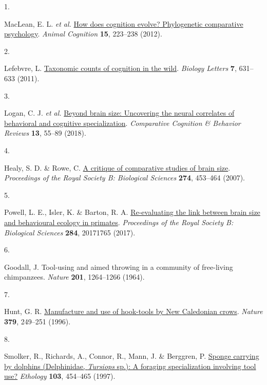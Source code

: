 \documentclass[
  man,floatsintext]{apa6}
\newlength{\cslhangindent}
\newlength{\csllabelwidth}
\newlength{\cslentryspacingunit} %
\newenvironment{CSLReferences}[2] %
 {%
  \setlength{\parindent}{0pt}
  \ifodd #1
  \let\oldpar\par
  \def\par{\hangindent=\cslhangindent\oldpar}
  \fi
  \setlength{\parskip}{#2\cslentryspacingunit}
 }%
 {}
\newcommand{\CSLLeftMargin}[1]{\parbox[t]{\csllabelwidth}{#1}}
\newcommand{\CSLRightInline}[1]{\parbox[t]{\linewidth - \csllabelwidth}{#1}\break}
\begin{document}
\hypertarget{refs}{}
\begin{CSLReferences}{0}{0}
\leavevmode{}%
\CSLLeftMargin{1. }%
\CSLRightInline{MacLean, E. L. \emph{et al.} \href{https://doi.org/10.1007/s10071-011-0448-8}{How does cognition evolve? Phylogenetic comparative psychology}. \emph{Animal Cognition} \textbf{15}, 223--238 (2012).}

\leavevmode{}%
\CSLLeftMargin{2. }%
\CSLRightInline{Lefebvre, L. \href{https://doi.org/10.1098/rsbl.2010.0556}{Taxonomic counts of cognition in the wild}. \emph{Biology Letters} \textbf{7}, 631--633 (2011).}

\leavevmode{}%
\CSLLeftMargin{3. }%
\CSLRightInline{Logan, C. J. \emph{et al.} \href{https://doi.org/10.3819/CCBR.2018.130008}{Beyond brain size: Uncovering the neural correlates of behavioral and cognitive specialization}. \emph{Comparative Cognition \& Behavior Reviews} \textbf{13}, 55--89 (2018).}

\leavevmode{}%
\CSLLeftMargin{4. }%
\CSLRightInline{Healy, S. D. \& Rowe, C. \href{https://doi.org/10.1098/rspb.2006.3748}{A critique of comparative studies of brain size}. \emph{Proceedings of the Royal Society B: Biological Sciences} \textbf{274}, 453--464 (2007).}

\leavevmode{}%
\CSLLeftMargin{5. }%
\CSLRightInline{Powell, L. E., Isler, K. \& Barton, R. A. \href{https://doi.org/10.1098/rspb.2017.1765}{Re-evaluating the link between brain size and behavioural ecology in primates}. \emph{Proceedings of the Royal Society B: Biological Sciences} \textbf{284}, 20171765 (2017).}

\leavevmode{}%
\CSLLeftMargin{6. }%
\CSLRightInline{Goodall, J. Tool-using and aimed throwing in a community of free-living chimpanzees. \emph{Nature} \textbf{201}, 1264--1266 (1964).}

\leavevmode{}%
\CSLLeftMargin{7. }%
\CSLRightInline{Hunt, G. R. \href{https://doi.org/10.1038/379249a0}{Manufacture and use of hook-tools by {N}ew {C}aledonian crows}. \emph{Nature} \textbf{379}, 249--251 (1996).}

\leavevmode{}%
\CSLLeftMargin{8. }%
\CSLRightInline{Smolker, R., Richards, A., Connor, R., Mann, J. \& Berggren, P. \href{https://doi.org/10.1111/j.1439-0310.1997.tb00160.x}{Sponge carrying by dolphins ({D}elphinidae, \emph{{T}ursiops} sp.): A foraging specialization involving tool use?} \emph{Ethology} \textbf{103}, 454--465 (1997).}


\end{CSLReferences}
\end{document}
